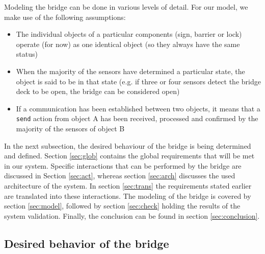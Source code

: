 Modeling the bridge can be done in various levels of detail. For our model, we make use of the following assumptions:
%
\begin{itemize}
	\item	The individual objects of a particular components (sign, barrier or lock) operate (for now) as one identical object (so they always have the same status)
	\item When the majority of the sensors have determined a particular state, the object is said to be in that state (e.g. if three or four sensors detect the bridge deck to be open, the bridge can be considered open)
	\item If a communication has been established between two objects, it means that a \texttt{send} action from object A has been received, processed and confirmed by the majority of the sensors of object B
\end{itemize}
%
In the next subsection, the desired behaviour of the bridge is being determined and defined. Section \ref{sec:glob} contains the global requirements that will be met in our system. Specific interactions that can be performed by the bridge are discussed in Section \ref{sec:act}, whereas section \ref{sec:arch} discusses the used architecture of the system. In section \ref{sec:trans} the requirements stated earlier are translated into these interactions. The modeling of the bridge is covered by section \ref{sec:model}, followed by section \ref{sec:check} holding the results of the system validation. Finally, the conclusion can be found in section \ref{sec:conclusion}.

\subsection{Desired behavior of the bridge}

